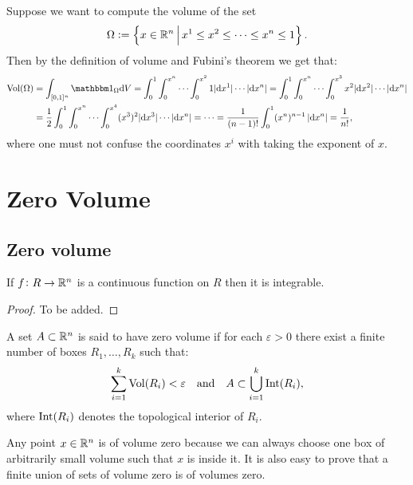 \documentclass[11pt,a4paper]{article}
\begin{document}
\begin{example}
  Suppose we want to compute the volume of the set
  \[
    \Omega := \left\{x \in \mathbb{R}^n \,\middle\vert\, x^1 \le x^2 \le \cdots \le x^n \le 1\right\}.
  \]
  Then by the definition of volume and Fubini's theorem we get that:
  \begin{align*}
    \Vol(\Omega) &=
    \int_{[0,1]^n} \ind_{\Omega} \dV =
    \int_{0}^{1} \int_{0}^{x^n} \cdots
      \int_{0}^{x^2} 1 |\dx^1| \cdots \abs{\dx^n} =
    \int_{0}^{1} \int_{0}^{x^n} \cdots
      \int_{0}^{x^3} x^2 |\dx^2| \cdots \abs{\dx^n} \\ &=
    \half \int_{0}^{1} \int_{0}^{x^n} \cdots
      \int_{0}^{x^4} (x^3)^2 |\dx^3| \cdots \abs{\dx^n} = \cdots =
    \frac{1}{(n - 1)!} \int_{0}^{1} (x^n)^{n-1} \abs{\dx^n} = \frac{1}{n!},
  \end{align*}
  where one must not confuse the coordinates $x^i$ with taking
  the exponent of $x$.
\end{example}

\newpage

\section{Zero Volume}

\subsection{Zero volume}

\begin{proposition}
  If $f \colon R \to \mathbb{R}^n$ is a continuous function on $R$
  then it is integrable.
\end{proposition}
\begin{proof}
  To be added.
\end{proof}

\begin{definition}
  A set $A \subset \mathbb{R}^n$ is said to have zero volume
  if for each $\varepsilon > 0$ there exist a finite number of
  boxes $R_1,\dots,R_k$ such that:
  \[
    \sum_{i=1}^{k}{\operatorname{Vol}(R_i)} < \varepsilon
    \quad \text{and} \quad
    A \subset \bigcup_{i=1}^{k}{\operatorname{Int}(R_i)},
  \]
  where $\operatorname{Int}(R_i)$ denotes the topological interior of $R_i$.
\end{definition}

\begin{remark}
  Any point $x \in \mathbb{R}^n$ is of volume zero because
  we can always choose one box of arbitrarily small volume such that
  $x$ is inside it.
  It is also easy to prove that a finite
  union of sets of volume zero is of volumes zero.
\end{remark}
\end{document}
